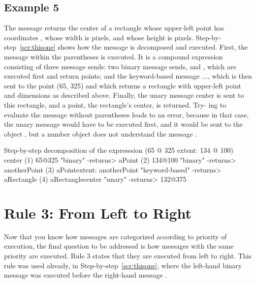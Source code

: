 \documentclass[a4paper,10pt,twoside]{book}
\begin{document}

\subsection{Example 5}

The message  returns the center of a rectangle whose 
upper-left point has coordinates , whose width is  pixels, and whose height
 is  pixels. Step-by-step~\ref{scr:thisone} shows how the message is decomposed and executed. First, the message 
within the parentheses is executed. It is a compound expression consisting of three message 
sends: two binary message sends,  and , which are executed first and return 
points; and the keyword-based message  ..., which is then sent to the point (65, 325) and 
which returns a rectangle with upper-left point and dimensions as described above. Finally, the 
unary message center is sent to this rectangle, and a point, the rectangle’s center, is returned. Try- 
ing to evaluate the message without parentheses leads to an error, because in that case, the unary 
message  would have to be executed first, and it would be sent to the object , but a 
number object does not understand the message . 


\begin{script}[thisone]{Step-by-step decomposition of the expresssion }
(65 @ 325 extent:  134 @ 100) center 
(1)  65@325                                      "binary" 
-returns> aPoint 
(2)                    134@100                   "binary" 
-returns> anotherPoint 
(3)  aPointextent: anotherPoint "keyword-based" 
-returns> aRectangle  
(4)  aRectanglecenter                           "unary" 
-returns> 132@375  
\end{script}



\section{Rule 3: From Left to Right}

Now that you know how messages are categorized according to priority of execution, the final 
question to be addressed is how messages with the same priority are executed. Rule 3 states 
that they are executed from left to right. This rule was used already, in Step-by-step~\ref{scr:thisone}, 
where the left-hand binary message  was executed before the right-hand message . 
\end{document}
